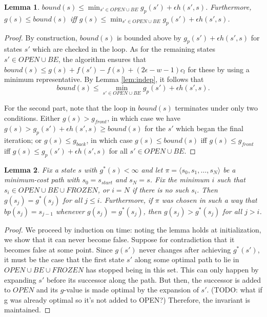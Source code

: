 \documentclass[letterpaper]{article}
\newtheorem{lemma}{Lemma}
\begin{document}
\begin{lemma}
\label{lem:bound}
$bound(s) \le \min_{s'\in OPEN \cup BE} g_p(s') + \epsilon h(s',s)$. Furthermore, $g(s) \le bound(s)$ iff $g(s) \le \min_{s'\in OPEN \cup BE} g_p(s') + \epsilon h(s',s)$.
\end{lemma}

\begin{proof}
By construction, $bound(s)$ is bounded above by $g_p(s') + \epsilon h(s',s)$ for states $s'$ which are checked in the loop. As for the remaining states $s' \in OPEN \cup BE$, the algorithm ensures that $bound(s) \le g(s) + f(s') - f(s) + (2\epsilon-w-1) c_l$ for these by using a minimum representative. By Lemma \ref{lem:indep}, it follows that
\[bound(s) \le \min_{s' \in OPEN \cup BE} g_p(s') + \epsilon h(s',s).\]

For the second part, note that the loop in $bound(s)$ terminates under only two conditions. Either $g(s) > g_{front}$, in which case we have $g(s) > g_p(s') + \epsilon h(s',s) \ge bound(s)$ for the $s'$ which began the final iteration; or $g(s) \le g_{back}$, in which case $g(s) \le bound(s)$ iff $g(s) \le g_{front}$ iff $g(s) \le g_p(s') + \epsilon h(s',s)$ for all $s' \in OPEN \cup BE$.
\end{proof}

\begin{lemma}
\label{lem:opt}
Fix a state $s$ with $g^*(s)<\infty$ and let $\pi = \langle s_0,s_1,\ldots,s_N \rangle$ be a minimum-cost path with $s_0 = s_{start}$ and $s_N = s$. Fix the minimum $i$ such that $s_i \in OPEN \cup BE \cup FROZEN$, or $i=N$ if there is no such $s_i$. Then $g(s_j) = g^*(s_j)$ for all $j\le i$. Furthermore, if $\pi$ was chosen in such a way that $bp(s_j) = s_{j-1}$ whenever $g(s_j) = g^*(s_j)$, then $g(s_j) > g^*(s_j)$ for all $j > i$.
\end{lemma}

\begin{proof}
We proceed by induction on time: noting the lemma holds at initialization, we show that it can never become false. Suppose for contradiction that it becomes false at some point. Since $g(s')$ never changes after achieving $g^*(s')$, it must be the case that the first state $s'$ along some optimal path to lie in $OPEN \cup BE \cup FROZEN$ has stopped being in this set. This can only happen by expanding $s'$ before its successor along the path. But then, the successor is added to $OPEN$ and its $g$-value is made optimal by the expansion of $s'$. (TODO: what if g was already optimal so it's not added to OPEN?) Therefore, the invariant is maintained.
\end{proof}
\end{document}
